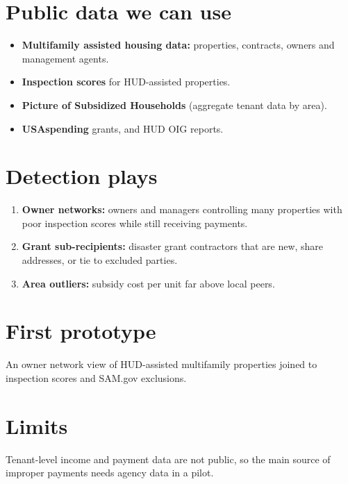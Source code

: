 \documentclass[letterpaper,11pt]{article}
\providecommand{\tightlist}{\setlength{\itemsep}{0pt}\setlength{\parskip}{0pt}}
\begin{document}
\hypertarget{public-data-we-can-use}{%
\section{Public data we can use}\label{public-data-we-can-use}}

\begin{itemize}
\tightlist
\item
  \textbf{Multifamily assisted housing data:} properties, contracts,
  owners and management agents.
\item
  \textbf{Inspection scores} for HUD-assisted properties.
\item
  \textbf{Picture of Subsidized Households} (aggregate tenant data by
  area).
\item
  \textbf{USAspending} grants, and HUD OIG reports.
\end{itemize}

\hypertarget{detection-plays}{%
\section{Detection plays}\label{detection-plays}}

\begin{enumerate}
\def\labelenumi{\arabic{enumi}.}
\tightlist
\item
  \textbf{Owner networks:} owners and managers controlling many
  properties with poor inspection scores while still receiving payments.
\item
  \textbf{Grant sub-recipients:} disaster grant contractors that are
  new, share addresses, or tie to excluded parties.
\item
  \textbf{Area outliers:} subsidy cost per unit far above local peers.
\end{enumerate}

\hypertarget{first-prototype}{%
\section{First prototype}\label{first-prototype}}

An owner network view of HUD-assisted multifamily properties joined to
inspection scores and SAM.gov exclusions.

\hypertarget{limits}{%
\section{Limits}\label{limits}}

Tenant-level income and payment data are not public, so the main source
of improper payments needs agency data in a pilot.
\end{document}
